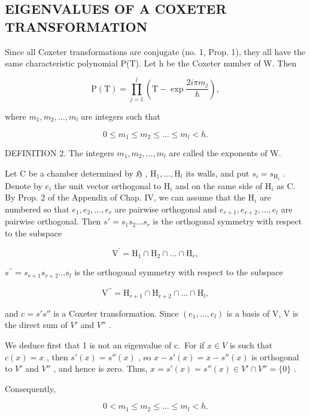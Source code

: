 \subsection{EIGENVALUES OF A COXETER TRANSFORMATION}

Since all Coxeter transformations are conjugate (no. 1, Prop. 1), they all have the same characteristic polynomial P(T). Let h be the Coxeter number of W. Then

\[
\mathrm{P} (\mathrm{T}) = \prod_ {j = 1} ^ {l} \left(\mathrm{T} - \exp \frac {2 i \pi m _ {j}}{h}\right),
\]

where \(m_{1}, m_{2}, \ldots, m_{l}\) are integers such that

\[
0 \leqslant m _ {1} \leqslant m _ {2} \leqslant \dots \leqslant m _ {l} <   h.
\]

DEFINITION 2. The integers \(m_1, m_2, \ldots, m_l\) are called the exponents of W.

Let C be a chamber determined by \(\mathfrak{H}\) , \(\mathrm{H}_1, \ldots, \mathrm{H}_l\) its walls, and put \(s_i = s_{\mathrm{H}_i}\) . Denote by \(e_i\) the unit vector orthogonal to \(\mathrm{H}_i\) and on the same side of \(\mathrm{H}_i\) as C. By Prop. 2 of the Appendix of Chap. IV, we can assume that the \(\mathrm{H}_i\) are numbered so that \(e_1, e_2, \ldots, e_r\) are pairwise orthogonal and \(e_{r+1}, e_{r+2}, \ldots, e_l\) are pairwise orthogonal. Then \(s' = s_1 s_2 \ldots s_r\) is the orthogonal symmetry with respect to the subspace

\[
\mathrm{V} ^ {\prime} = \mathrm{H} _ {1} \cap \mathrm{H} _ {2} \cap \dots \cap \mathrm{H} _ {r},
\]

\(s^{\prime \prime} = s_{r + 1}s_{r + 2}\dots s_{l}\) is the orthogonal symmetry with respect to the subspace

\[
\mathrm{V} ^ {\prime \prime} = \mathrm{H} _ {r + 1} \cap \mathrm{H} _ {r + 2} \cap \dots \cap \mathrm{H} _ {l},
\]

and \(c = s's''\) is a Coxeter transformation. Since \((e_{1}, \ldots, e_{l})\) is a basis of V, V is the direct sum of \(V'\) and \(V''\) .

We deduce first that 1 is not an eigenvalue of c.~For if \(x \in V\) is such that \(c(x) = x\) , then \(s'(x) = s''(x)\) , so \(x - s'(x) = x - s''(x)\) is orthogonal to \(V'\) and \(V''\) , and hence is zero. Thus, \(x = s'(x) = s''(x) \in V' \cap V'' = \{0\}\) .

Consequently,

\[
0 <   m _ {1} \leqslant m _ {2} \leqslant \dots \leqslant m _ {l} <   h.\tag{1}
\]

